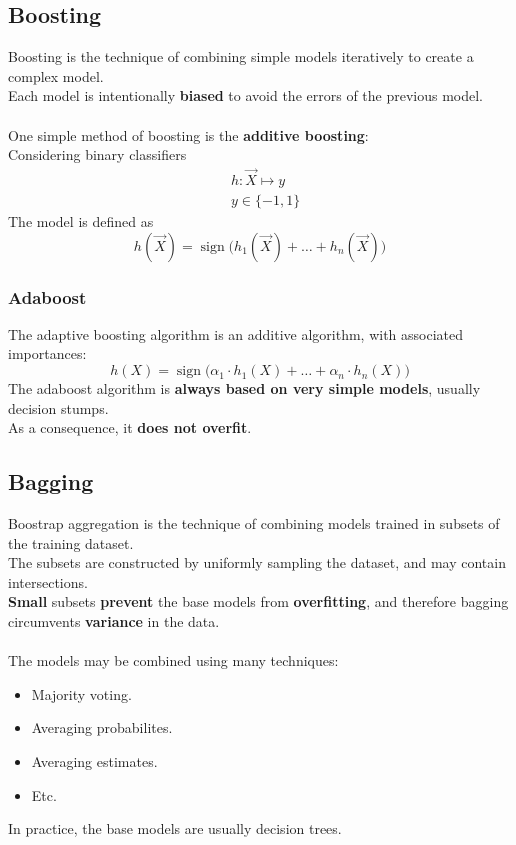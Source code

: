 \documentclass[11pt]{article}
\DeclareMathOperator{\sign}{sign}
\begin{document}
\subsection{Boosting}
\label{sec:org52ec4a8}
Boosting is the technique of combining simple models iteratively to create a complex
model. \\
Each model is intentionally \textbf{biased} to avoid the errors of the previous model.
\\ \\
One simple method of boosting is the \textbf{additive boosting}: \\
Considering binary classifiers
\begin{align*}
  & h: \vec{X} \mapsto y \\
  & y \in \{ -1, 1 \}
\end{align*}
The model is defined as
\[
h(\vec{X}) = \sign\big(h_1(\vec{X}) + \hdots + h_n(\vec{X})\big)
\]
\subsubsection{Adaboost}
\label{sec:orgdb8a949}
The adaptive boosting algorithm is an additive algorithm, with associated importances:
\[
  h(X) = \sign\big(\alpha_1 \cdot h_1(X) + \hdots + \alpha_n \cdot h_n(X)\big)
\]
The adaboost algorithm is \textbf{always based on very simple models}, usually decision
stumps. \\
As a consequence, it \textbf{does not overfit}.
\subsection{Bagging}
\label{sec:org06be563}
Boostrap aggregation is the technique of combining models trained in subsets of the
training dataset. \\
The subsets are constructed by uniformly sampling the dataset, and may contain
intersections. \\
\textbf{Small} subsets \textbf{prevent} the base models from \textbf{overfitting}, and therefore bagging
circumvents \textbf{variance} in the data. \\ \\
The models may be combined using many techniques:
\begin{itemize}[itemsep=0pt]
\item Majority voting.
\item Averaging probabilites.
\item Averaging estimates.
\item Etc.
\end{itemize}
In practice, the base models are usually decision trees.
\end{document}
